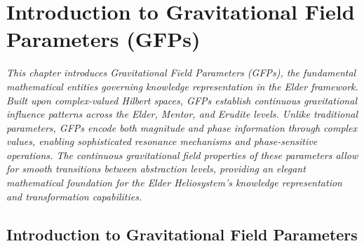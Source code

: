 \chapter{Introduction to Gravitational Field Parameters (GFPs)}

\textit{This chapter introduces Gravitational Field Parameters (GFPs), the fundamental mathematical entities governing knowledge representation in the Elder framework. Built upon complex-valued Hilbert spaces, GFPs establish continuous gravitational influence patterns across the Elder, Mentor, and Erudite levels. Unlike traditional parameters, GFPs encode both magnitude and phase information through complex values, enabling sophisticated resonance mechanisms and phase-sensitive operations. The continuous gravitational field properties of these parameters allow for smooth transitions between abstraction levels, providing an elegant mathematical foundation for the Elder Heliosystem's knowledge representation and transformation capabilities.}

\section{Introduction to Gravitational Field Parameters}

